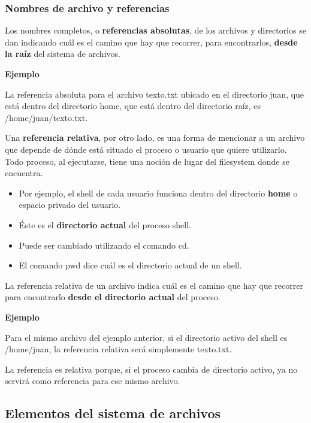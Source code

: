 \documentclass[spanish,a4paper,]{article}
\providecommand{\tightlist}{%
  \setlength{\itemsep}{0pt}\setlength{\parskip}{0pt}}
\begin{document}
\hypertarget{nombres-de-archivo-y-referencias}{%
\subsubsection{Nombres de archivo y
referencias}\label{nombres-de-archivo-y-referencias}}

Los nombres completos, o \textbf{referencias absolutas}, de los archivos
y directorios se dan indicando cuál es el camino que hay que recorrer,
para encontrarlos, \textbf{desde la raíz} del sistema de archivos.

\textbf{Ejemplo}

La referencia absoluta para el archivo texto.txt ubicado en el
directorio juan, que está dentro del directorio home, que está dentro
del directorio raíz, es /home/juan/texto.txt.

Una \textbf{referencia relativa}, por otro lado, es una forma de
mencionar a un archivo que depende de dónde está situado el proceso o
usuario que quiere utilizarlo. Todo proceso, al ejecutarse, tiene una
noción de lugar del filesystem donde se encuentra.

\begin{itemize}
\tightlist
\item
  Por ejemplo, el shell de cada usuario funciona dentro del directorio
  \textbf{home} o espacio privado del usuario.
\item
  Éste es el \textbf{directorio actual} del proceso shell.
\item
  Puede ser cambiado utilizando el comando cd.
\item
  El comando pwd dice cuál es el directorio actual de un shell.
\end{itemize}

La referencia relativa de un archivo indica cuál es el camino que hay
que recorrer para encontrarlo \textbf{desde el directorio actual} del
proceso.

\textbf{Ejemplo}

Para el mismo archivo del ejemplo anterior, si el directorio activo del
shell es /home/juan, la referencia relativa será simplemente texto.txt.

La referencia es relativa porque, si el proceso cambia de directorio
activo, ya no servirá como referencia para ese mismo archivo.

\hypertarget{elementos-del-sistema-de-archivos}{%
\subsection{Elementos del sistema de
archivos}\label{elementos-del-sistema-de-archivos}}
\end{document}
